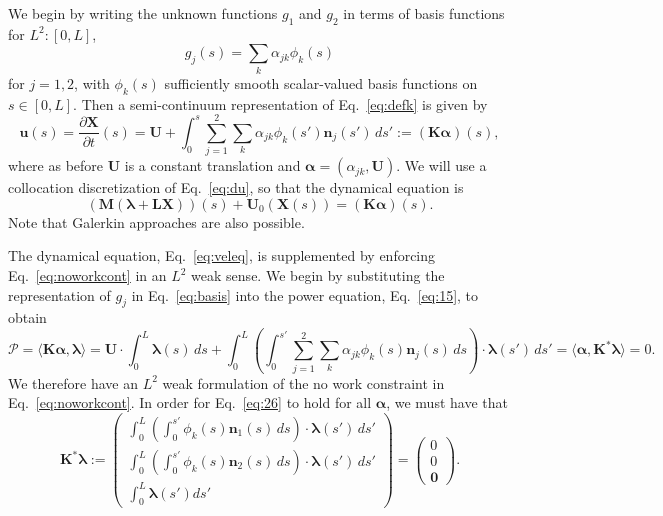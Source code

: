 We begin by writing the unknown functions $g_1$ and $g_2$ in terms of basis functions for $L^2:[0,L]$, 
\begin{equation}
\label{eq:basis}
g_j(s) = \sum_k \alpha_{jk} \phi_k(s)
\end{equation}
for $j=1, 2$, with $\phi_k(s)$ sufficiently smooth scalar-valued basis functions on $s \in [0,L]$. Then a semi-continuum representation of Eq.\ \eqref{eq:defk} is given by 
\begin{equation}
\label{eq:du}
   \bm{u}(s)=\frac{\partial \bm{X}}{\partial t}(s) =\bm{U} + \int_0^s \sum_{j=1}^2\sum_k \alpha_{jk} \phi_k(s') \bm{n}_j(s') \, ds':=(\bm{K}\bm{\alpha})(s),
\end{equation}
where as before $\bm{U}$ is a constant translation and $\bm{\alpha}=(\alpha_{jk},\bm{U})$. We will use a collocation discretization of Eq.\ \eqref{eq:du}, so that the dynamical equation is
\begin{equation}
    \label{eq:veleq}
    \left(\bm{M}(\bm{\lambda} +\bm{L}\bm{X})\right)(s) +\bm{U}_0(\bm{X}(s))= \left(\bm{K} \bm{\alpha}\right)(s). 
\end{equation}
Note that Galerkin approaches are also possible. 

The dynamical equation, Eq.\ \eqref{eq:veleq}, is supplemented by enforcing Eq.\ \eqref{eq:noworkcont} in an $L^2$ weak sense. We begin by substituting the representation of $g_j$ in Eq.\ \eqref{eq:basis} into the power equation, Eq.\ \eqref{eq:15}, to obtain 
\begin{equation}
\label{eq:26}
\mathcal{P} = \langle\bm{K}\bm{\alpha},\bm{\lambda}\rangle=\bm{U} \cdot \int_0^L \bm{\lambda}(s) \, ds + \int_0^L \left(\int_0^{s'} \sum_{j=1}^2\sum_{k} \alpha_{jk} \phi_k(s) \bm{n}_j(s) \, ds\right)\cdot \bm{\lambda}(s') \, ds' =\langle \bm{\alpha},\bm{K}^*\bm{\lambda}\rangle =0. 
\end{equation}
We therefore have an $L^2$ weak formulation of the no work constraint in Eq.\ \eqref{eq:noworkcont}. In order for Eq.\ \eqref{eq:26} to hold for all $\bm{\alpha}$, we must have that 
\begin{equation}
\label{eq:noworkcontL2}
\bm{K}^* \bm{\lambda}:=\begin{pmatrix} \int_0^L \left(\int_0^{s'} \phi_k(s) \bm{n}_1(s) \, ds\right)\cdot \bm{\lambda}(s') \, ds'\\[2 pt] \int_0^L \left(\int_0^{s'} \phi_k(s) \bm{n}_2(s) \, ds\right)\cdot \bm{\lambda}(s') \, ds'\\[2 pt] \int_0^L \bm{\lambda}(s') ds' \end{pmatrix} = \begin{pmatrix} 0 \\[2 pt] 0\\[2 pt] \bm{0}\end{pmatrix}. 
\end{equation}

